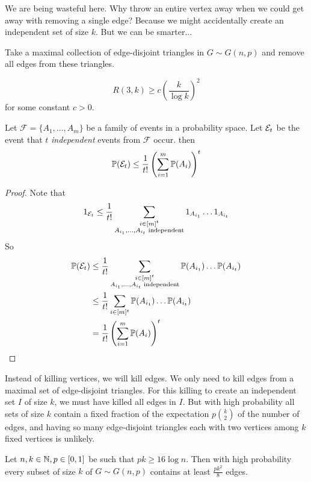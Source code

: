 \documentclass{article}
\begin{document}
We are being wasteful here. Why throw an entire vertex away when we could get away with removing a single edge? Because we might accidentally create an independent set of size $k$. But we can be smarter...

\begin{idea}
  Take a maximal collection of edge-disjoint triangles in $G \sim G(n, p)$ and remove all edges from these triangles.
\end{idea}

\begin{thm}[Erd\H os]
  $$R(3, k) \ge c\left(\frac k{\log k}\right)^2$$
  for some constant $c > 0$.
\end{thm}

\begin{lem}
  Let $\mathcal F = \{A_1, \dots, A_m\}$ be a family of events in a probability space. Let $\mathcal E_t$ be the event that $t$ {\it independent} events from $\mathcal F$ occur. then
  $$\mathbb P(\mathcal E_t) \le \frac 1{t!}\left(\sum_{i = 1}^m \mathbb P(A_i)\right)^t$$
\end{lem}
\begin{proof}
  Note that
  $$1_{\mathcal E_t} \le \frac 1{t!} \sum_{\substack{i \in [m]^t \\ A_{i_1}, \dots, A_{i_t}\text{ independent}}} 1_{A_{i_1}} \dots 1_{A_{i_t}}$$
  So
  \begin{align*}
    \mathbb P(\mathcal E_t)
    & \le \frac 1{t!} \sum_{\substack{i \in [m]^t \\ A_{i_1}, \dots, A_{i_t}\text{ independent}}} \mathbb P(A_{i_1}) \dots \mathbb P(A_{i_t}) \\
    & \le \frac 1{t!} \sum_{i \in [m]^t} \mathbb P(A_{i_1}) \dots \mathbb P(A_{i_t}) \\
    & = \frac 1{t!} \left(\sum_{i = 1}^m \mathbb P(A_i)\right)^t
  \end{align*}
\end{proof}

\newlec

\begin{idea}
  Instead of killing vertices, we will kill edges. We only need to kill edges from a maximal set of edge-disjoint triangles. For this killing to create an independent set $I$ of size $k$, we must have killed all edges in $I$. But with high probability all sets of size $k$ contain a fixed fraction of the expectation $p\binom k2$ of the number of edges, and having so many edge-disjoint triangles each with two vertices among $k$ fixed vertices is unlikely.
\end{idea}

\begin{lem}
  Let $n, k \in \mathbb N, p \in [0, 1]$ be such that $pk \ge 16\log n$. Then with high probability every subset of size $k$ of $G \sim G(n, p)$ contains at least $\frac{pk^2}8$ edges.
\end{lem}
\end{document}

